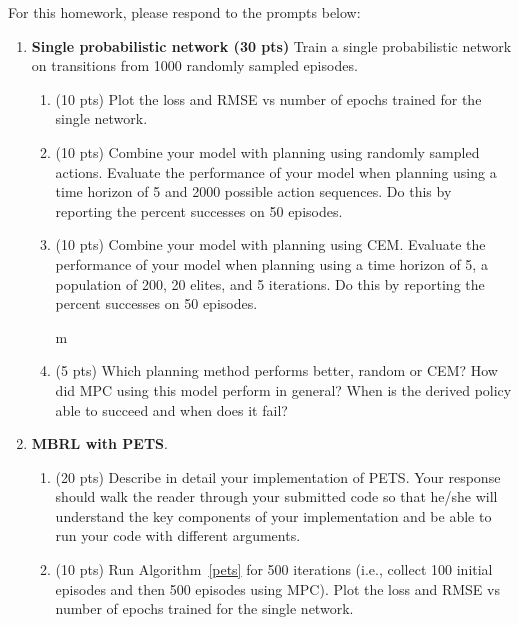 \documentclass[12pt]{article}
\begin{document}
For this homework, please respond to the prompts below:
\begin{enumerate}
\item \textbf{Single probabilistic network (30 pts)} Train a single probabilistic network on transitions from 1000 randomly sampled episodes.  
\begin{enumerate}
    \item (10 pts) Plot the loss and RMSE vs number of epochs trained for the single network.
    \begin{solution}
    \end{solution}
    \item (10 pts) Combine your model with planning using randomly sampled actions.  Evaluate the performance of your model when planning using a time horizon of 5 and 2000 possible action sequences.  Do this by reporting the percent successes on 50 episodes.
    \begin{solution}
    \end{solution}
    \item (10 pts) Combine your model with planning using CEM.  Evaluate the performance of your model when planning using a time horizon of 5, a population of 200, 20 elites, and 5 iterations.  Do this by reporting the percent successes on 50 episodes.
    \begin{solution}
    \end{solution} m
    \item (5 pts) Which planning method performs better, random or CEM?  How did MPC using this model perform in general?  When is the derived policy able to succeed and when does it fail?
    \begin{solution}
    \end{solution}
\end{enumerate}
\item \textbf{MBRL with PETS}.  
\begin{enumerate}
    \item (20 pts) Describe in detail your implementation of PETS.  Your response should walk the reader through your submitted code so that he/she will understand the key components of your implementation and be able to run your code with different arguments.
    \begin{solution}
    \end{solution}
    \item (10 pts) Run Algorithm~\ref{pets} for 500 iterations (i.e., collect 100 initial episodes and then 500 episodes using MPC).  Plot the loss and RMSE vs number of epochs trained for the single network.  

\end{enumerate}
\end{enumerate}
\end{document}

